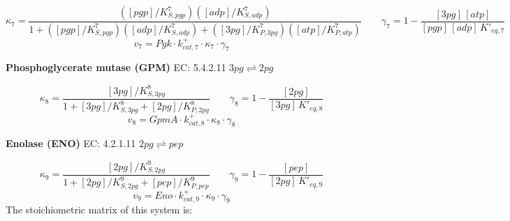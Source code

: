 \begin{equation}
    \kappa_7 = \frac{([pgp]/K_{S,pgp}^7)([adp]/K_{S,adp}^7)}%
                    {1 + ([pgp]/K_{S,pgp}^7)([adp]/K_{S,adp}^7) + ([3pg]/K_{P,3pg}^7)([atp]/K_{P,atp}^7)}
    \qquad
    \gamma_7 = 1 - \frac{[3pg]\,[atp]}{[pgp]\,[adp]\,K'_{eq,7}}
\end{equation}
\begin{equation}
    v_7 = Pgk \cdot k^+_{cat,7} \cdot \kappa_7 \cdot \gamma_7
    \label{eqn: pgk}
\end{equation}

\textbf{Phosphoglycerate mutase (GPM)} \quad EC: 5.4.2.11 \quad $3pg \rightleftharpoons 2pg$

\begin{equation}
    \kappa_8 = \frac{[3pg]/K_{S,3pg}^8}%
                    {1 + [3pg]/K_{S,3pg}^8 + [2pg]/K_{P,2pg}^8}
    \qquad
    \gamma_8 = 1 - \frac{[2pg]}{[3pg]\,K'_{eq,8}}
\end{equation}
\begin{equation}
    v_8 = GpmA \cdot k^+_{cat,8} \cdot \kappa_8 \cdot \gamma_8
    \label{eqn: gpm}
\end{equation}

\textbf{Enolase (ENO)} \quad EC: 4.2.1.11 \quad $2pg \rightleftharpoons pep$

\begin{equation}
    \kappa_9 = \frac{[2pg]/K_{S,2pg}^9}%
                    {1 + [2pg]/K_{S,2pg}^9 + [pep]/K_{P,pep}^9}
    \qquad
    \gamma_9 = 1 - \frac{[pep]}{[2pg]\,K'_{eq,9}}
\end{equation}
\begin{equation}
    v_9 = Eno \cdot k^+_{cat,9} \cdot \kappa_9 \cdot \gamma_9
    \label{eqn: eno}
\end{equation}
The stoichiometric matrix of this system is:

